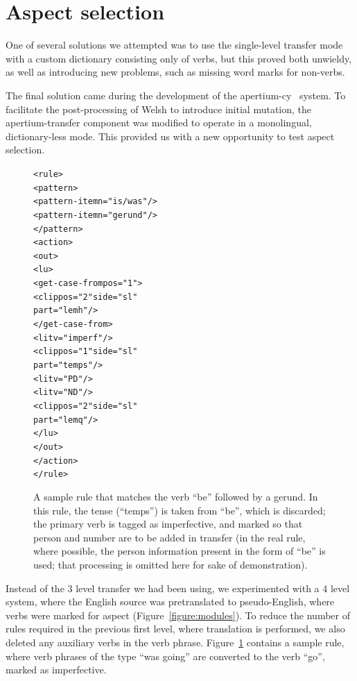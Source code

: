 \documentclass[11pt]{article}
\begin{document}
\section{Aspect selection}

One of several solutions we attempted was to use the single-level transfer
mode with a custom dictionary consisting only of verbs, but this proved both
unwieldy, as well as introducing new problems, such as missing word marks for
non-verbs.

The final solution came during the development of the apertium-cy~\citep{tyers2009acd}
system. To facilitate the post-processing of Welsh to introduce initial mutation, the
apertium-transfer component was modified to operate in a monolingual, dictionary-less
mode. This provided us with a new opportunity to test aspect selection.

\begin{figure}[p]
\begin{small}
\begin{alltt}
<rule>
  <pattern>
    <pattern-item n="is/was"/>
    <pattern-item n="gerund"/>
  </pattern>
  <action>
    <out>
      <lu>
        <get-case-from pos="1">
          <clip pos="2" side="sl" 
           part="lemh"/>
        </get-case-from>
        <lit v="imperf"/>
        <clip pos="1" side="sl" 
         part="temps"/>
        <lit v="PD"/>
        <lit v="ND"/>
        <clip pos="2" side="sl" 
         part="lemq"/>
      </lu>  
    </out>
  </action>
</rule>
\end{alltt}
\end{small}
\caption{A sample rule that matches the verb ``be'' followed by a
gerund. In this rule, the tense (``temps'') is taken from ``be'', which
is discarded; the primary verb is tagged as imperfective, and marked so
that person and number are to be added in transfer (in the real rule, 
where possible, the person information present in the form of ``be'' is
used; that processing is omitted here for sake of demonstration).}
\label{figure:rule}
\end{figure}

Instead of the 3 level transfer we had been using, we experimented with a 4 level
system, where the English source was pretranslated to pseudo-English, where verbs
were marked for aspect (Figure~\ref{figure:modules}). To reduce the number of 
rules required in the previous first level, where translation is performed, 
we also deleted any auxiliary verbs in
the verb phrase. Figure~\ref{figure:rule} contains a sample rule, where verb 
phrases of the type ``was going'' are converted to the verb ``go'', marked as
imperfective.
\end{document}
